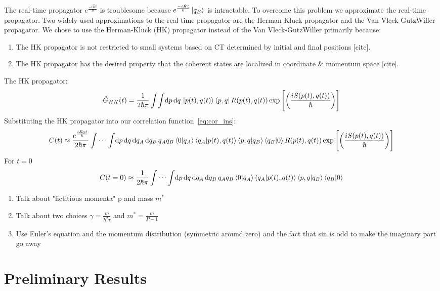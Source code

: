 \documentclass[12pt,letterpaper,oneside,final,titlepage]{article}               %
\numberwithin{equation}{section} %
\newcommand{\emiHt}{e^{\frac{-i\hat{H}t}{\hbar}}}
\newcommand{\expb}[1]{\ensuremath{\exp{\left[ #1 \right]}}}
\begin{document}
The real-time propagator $\emiHt$ is troublesome because $\emiHt\ket{q_{B}}$ is intractable. 
To overcome this problem we approximate the real-time propagator.
Two widely used approximations to the real-time propagator are the Herman-Kluck propagator and the Van Vleck-GutzWiller propagator.
We chose to use the Herman-Kluck (HK) propagator instead of the Van Vleck-GutzWiller primarily because:
\begin{enumerate}
    \item The HK propagator is not restricted to small systems based on CT determined by initial and final positions [cite].
    \item The HK propagator has the desired property that the coherent states are localized in coordinate $\&$ momentum space [cite].
\end{enumerate}
The HK propagator:
\begin{equation}\label{eq:HKprop}
    \hat{G}_{HK}(t) = \frac{1}{2\hbar\pi}\int\!\int \!\dif p\,\!\dif q\, 
    \ket{p(t), q(t)}\bra{p,q} R(p(t),q(t))
    \expb{\left(\frac{iS(p(t),q(t))}{\hbar}\right)}
\end{equation}
Substituting the HK propagator into our correlation function~\eqref{eq:cor_ins}:
\begin{equation*}
    C(t) \approx \frac{e^{\frac{iE_{0}t}{\hbar}}}{2\hbar\pi}\int\cdots\int\! \dif p\,\!\dif q\,\!\dif q_{A}\,\!\dif q_{B}\,
    q_{A}q_{B}\braket{0|q_{A}}\braket{q_{A}|p(t), q(t)} \braket{p,q|q_{B}}\braket{q_{B}|0}
    R(p(t),q(t)) \expb{\left(\frac{iS(p(t),q(t))}{\hbar}\right)}
\end{equation*}
For $t=0$
\begin{equation*}
    C(t=0) \approx \frac{1}{2\hbar\pi}\int\cdots\int\! \dif p\,\!\dif q\,\!\dif q_{A}\,\!\dif q_{B}\,
    q_{A}q_{B}\braket{0|q_{A}}\braket{q_{A}|p(t), q(t)} \braket{p,q|q_{B}}\braket{q_{B}|0}
\end{equation*}
\begin{enumerate}
    \item Talk about "fictitious momenta" p and mass $m^{*}$
    \item Talk about two choices $\gamma = \frac{m}{\hbar^{2}\tau}$ and $m^{*} = \frac{m}{P-1}$
    \item Use Euler's equation and the momentum distribution (symmetric around zero) and the fact that sin is odd to make the imaginary part go away
\end{enumerate}


\section{Preliminary Results}
\end{document}
